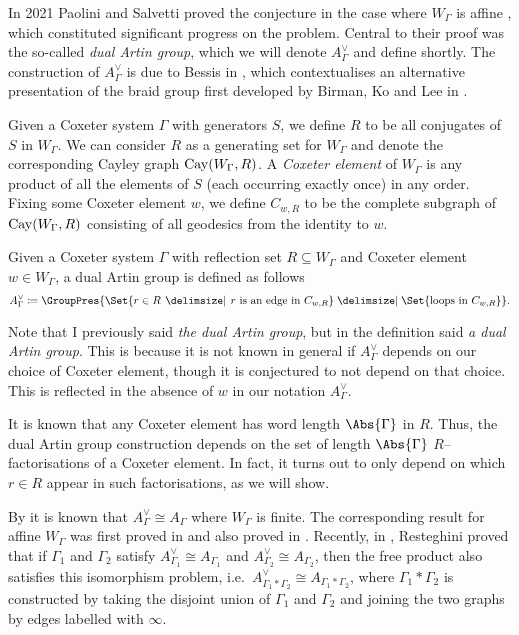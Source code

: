In 2021 Paolini and Salvetti proved the conjecture in the case where $W_\Gamma$ is affine \cite{paolini_salvetti_kpi1_2021}, which constituted significant progress on the problem.
Central to their proof was the so-called \emph{dual Artin group}, which we will denote $A^\vee_\Gamma$ and define shortly.
The construction of $A^\vee_\Gamma$ is due to Bessis in \cite{bessis_dual_2003}, which contextualises an alternative presentation of the braid group first developed by Birman, Ko and Lee in \cite{birman_etal_new_1998}.

Given a Coxeter system $\Gamma$ with generators $S$, we define $R$ to be all conjugates of  $S$ in  $W_\Gamma$.
We can consider $R$ as a generating set for $W_\Gamma$ and denote the corresponding Cayley graph  $\operatorname{Cay}(W_\Gamma,R)$.
A \emph{Coxeter element} of  $W_\Gamma$ is any product of all the elements of $S$ (each occurring exactly once) in any order.
Fixing some Coxeter element $w$, we define $C_{w,R}$ to be the complete subgraph of $\operatorname{Cay}(W_\Gamma,R)$ consisting of all geodesics from the identity to $w$.

\begin{definition}
	\label{def:dual_artin}
	Given a Coxeter system $\Gamma$ with reflection set  $R \subseteq W_\Gamma$ and Coxeter element $w \in W_\Gamma$, a dual Artin group is defined as follows
	\[
		A^\vee_\Gamma \coloneq \GroupPres{\Set{r \in R \given r \text{ is an edge in } C_{w,R}} \relations \Set{ \text{loops in } C_{w,R}}}
		.\]
\end{definition}

Note that I previously said \emph{the dual Artin group}, but in the definition said \emph{a dual Artin group}.
This is because it is not known in general if $A^\vee_\Gamma$ depends on our choice of Coxeter element, though it is conjectured to not depend on that choice.
This is reflected in the absence of $w$ in our notation  $A^\vee_\Gamma$.

It is known that any Coxeter element has word length $\Abs{\Gamma}$ in $R$.
Thus, the dual Artin group construction depends on the set of length $\Abs{\Gamma}$ $R$--factorisations of  a Coxeter element.
In fact, it turns out to only depend on which $r \in R$ appear in such factorisations, as we will show.

By \cite{bessis_dual_2003, brady_watt_kp_2002} it is known that $A^\vee_\Gamma \cong A_\Gamma$ where  $W_\Gamma$ is finite.
The corresponding result for affine $W_\Gamma$ was first proved in \cite{mccammond_sulway_artin_2017} and also proved in \cite{paolini_salvetti_kpi1_2021}.
Recently, in \cite{resteghini_free_2024}, Resteghini proved that if $\Gamma_1$ and  $\Gamma_2$ satisfy $A^\vee_{\Gamma_1} \cong A_{\Gamma_1}$ and $A^\vee_{\Gamma_2}\cong A_{\Gamma_2}$, then the free product also satisfies this isomorphism problem, i.e.~$A^\vee_{\Gamma_1 \ast \Gamma_2} \cong A_{\Gamma_1\ast \Gamma_2}$, where $\Gamma_1 \ast \Gamma_2$ is constructed by taking the disjoint union of $\Gamma_1$ and  $\Gamma_2$ and joining the two graphs by edges labelled with $\infty$.

